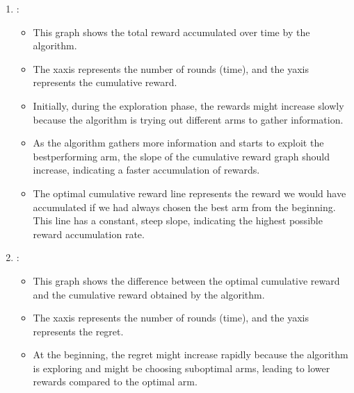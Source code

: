\documentclass[letterpaper,10pt,english]{jupyterBook}
\begin{document}
\begin{enumerate}
%
\item {} 
\sphinxAtStartPar
{}:
\begin{itemize}
\item {} 
\sphinxAtStartPar
This graph shows the total reward accumulated over time by the algorithm.

\item {} 
\sphinxAtStartPar
The x\sphinxhyphen{}axis represents the number of rounds (time), and the y\sphinxhyphen{}axis represents the cumulative reward.

\item {} 
\sphinxAtStartPar
Initially, during the exploration phase, the rewards might increase slowly because the algorithm is trying out different arms to gather information.

\item {} 
\sphinxAtStartPar
As the algorithm gathers more information and starts to exploit the best\sphinxhyphen{}performing arm, the slope of the cumulative reward graph should increase, indicating a faster accumulation of rewards.

\item {} 
\sphinxAtStartPar
The optimal cumulative reward line represents the reward we would have accumulated if we had always chosen the best arm from the beginning. This line has a constant, steep slope, indicating the highest possible reward accumulation rate.

\end{itemize}

\item {} 
\sphinxAtStartPar
{}:
\begin{itemize}
\item {} 
\sphinxAtStartPar
This graph shows the difference between the optimal cumulative reward and the cumulative reward obtained by the algorithm.

\item {} 
\sphinxAtStartPar
The x\sphinxhyphen{}axis represents the number of rounds (time), and the y\sphinxhyphen{}axis represents the regret.

\item {} 
\sphinxAtStartPar
At the beginning, the regret might increase rapidly because the algorithm is exploring and might be choosing suboptimal arms, leading to lower rewards compared to the optimal arm.


\end{itemize}
\end{enumerate}
\end{document}
